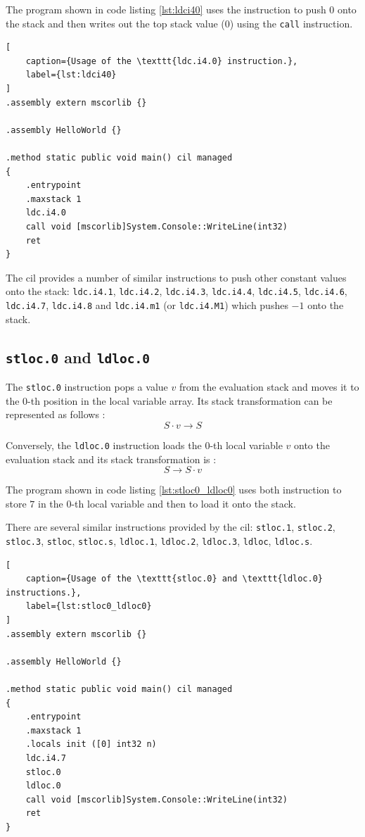 \documentclass[declaration,shortabstract,english,mgr]{iithesis}
\begin{document}
The program shown in code listing \ref{lst:ldci40} uses the instruction to push $0$ onto the stack and then writes out the top stack value ($0$) using the \texttt{call} instruction.

\begin{lstlisting}[
	caption={Usage of the \texttt{ldc.i4.0} instruction.},
	label={lst:ldci40}
]
.assembly extern mscorlib {}

.assembly HelloWorld {}

.method static public void main() cil managed
{
	.entrypoint
	.maxstack 1
	ldc.i4.0
	call void [mscorlib]System.Console::WriteLine(int32)
	ret
}
\end{lstlisting}

The \acrshort{cil} provides a number of similar instructions to push other constant values onto the stack: \texttt{ldc.i4.1}, \texttt{ldc.i4.2}, \texttt{ldc.i4.3}, \texttt{ldc.i4.4}, \texttt{ldc.i4.5}, \texttt{ldc.i4.6}, \texttt{ldc.i4.7}, \texttt{ldc.i4.8} and \texttt{ldc.i4.m1} (or \texttt{ldc.i4.M1}) which pushes $-1$ onto the stack.

\subsection{\texttt{stloc.0} and \texttt{ldloc.0}}
\label{sec:desc_stloc0_ldloc0}

The \texttt{stloc.0} instruction pops a value $v$ from the evaluation stack and moves it to the $0$-th position in the local variable array. Its stack transformation can be represented as follows \cite{ecmaStandard}:
$$
	S \cdot v \rightarrow S
$$

Conversely, the \texttt{ldloc.0} instruction loads the $0$-th local variable $v$ onto the evaluation stack and its stack transformation is \cite{ecmaStandard}:
$$
	S \rightarrow S \cdot v
$$

The program shown in code listing \ref{lst:stloc0_ldloc0} uses both instruction to store $7$ in the $0$-th local variable and then to load it onto the stack.

There are several similar instructions provided by the \acrshort{cil}: \texttt{stloc.1}, \texttt{stloc.2}, \texttt{stloc.3}, \texttt{stloc}, \texttt{stloc.s}, \texttt{ldloc.1}, \texttt{ldloc.2}, \texttt{ldloc.3}, \texttt{ldloc}, \texttt{ldloc.s}.

\begin{lstlisting}[
	caption={Usage of the \texttt{stloc.0} and \texttt{ldloc.0} instructions.},
	label={lst:stloc0_ldloc0}
]
.assembly extern mscorlib {}

.assembly HelloWorld {}

.method static public void main() cil managed
{
	.entrypoint
	.maxstack 1
	.locals init ([0] int32 n)
	ldc.i4.7
	stloc.0
	ldloc.0
	call void [mscorlib]System.Console::WriteLine(int32)
	ret
}
\end{lstlisting}
\end{document}
